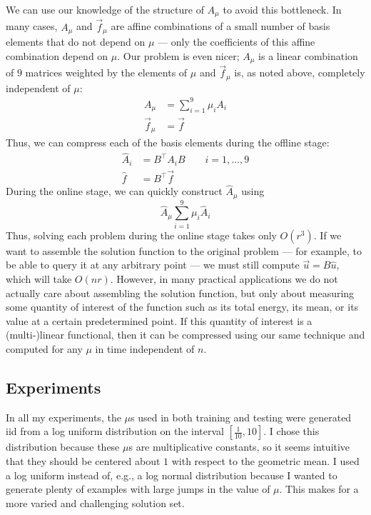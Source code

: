 \documentclass[11pt]{article}
\begin{document}
We can use our knowledge of the structure of $A_{\mu}$ to avoid this bottleneck.
In many cases, $A_{\mu}$ and $\vec f_{\mu}$ are affine combinations of a small number of
basis elements that do not depend on $\mu$ --- only the coefficients of this affine combination depend on $\mu$.
Our problem is even nicer; $A_{\mu}$ is a linear combination of $9$ matrices weighted by the elements of $\mu$
and $\vec f_{\mu}$ is, as noted above, completely independent of $\mu$:
\begin{align*}
    A_{\mu} &= \sum_{i = 1}^9 \mu_i A_i\\
    \vec f_{\mu} &= \vec f
\end{align*}
Thus, we can compress each of the basis elements during the offline stage:
\begin{align*}
    \widehat A_i &= B^\top A_i B \qquad i = 1, \ldots, 9\\
    \widehat f &= B^\top \vec f
\end{align*}
During the online stage, we can quickly construct $\widehat A_{\mu}$ using
\[ \widehat A_{\mu} \sum_{i = 1}^9 \mu_i \widehat A_i \]
Thus, solving each problem during the online stage takes only $O(r^3)$.
If we want to assemble the solution function to the original problem --- for example, to
be able to query it at any arbitrary point --- we must still compute
$\vec u = B \widehat u$, which will take $O(nr)$.
However, in many practical applications we do not actually care about assembling the
solution function, but only about measuring some quantity of interest of the function such as its
total energy, its mean, or its value at a certain predetermined point.
If this quantity of interest is a (multi-)linear functional, then it can be compressed
using our same technique and computed for any $\mu$ in time independent of $n$. \\

\subsection{Experiments}
In all my experiments, the $\mu$s used in both training and testing
were generated iid from a log uniform distribution on the interval $[\frac1{10}, 10]$.
I chose this distribution because these $\mu$s are multiplicative constants, so it seems intuitive that they should be
centered about $1$ with respect to the geometric mean. I used a log uniform instead of,
e.g., a log normal distribution because I wanted to generate plenty of examples with large jumps in the value of $\mu$.
This makes for a more varied and challenging solution set.
\end{document}
